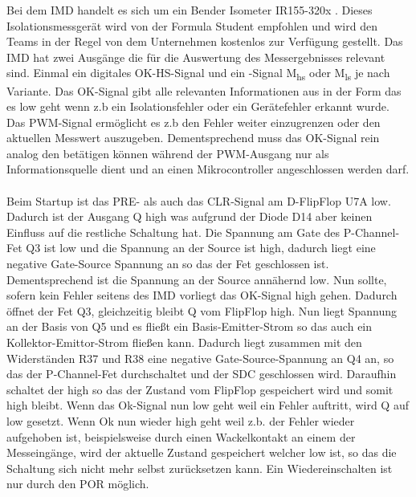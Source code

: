 Bei dem \ac{IMD} handelt es sich um ein Bender Isometer IR155-320x \cite{ISOMETERIR155-3203/IR155-3204}. Dieses Isolationsmessgerät wird von der Formula Student empfohlen und wird den Teams in der Regel von dem Unternehmen kostenlos zur Verfügung gestellt.
Das \ac{IMD} hat zwei Ausgänge die für die Auswertung des Messergebnisses relevant sind. Einmal ein digitales OK-HS-Signal und ein -Signal M\textsubscript{hs} oder M\textsubscript{ls} je nach Variante. Das OK-Signal gibt alle relevanten Informationen aus in der Form das es low geht wenn z.b ein Isolationsfehler oder ein Gerätefehler erkannt wurde. Das \ac{PWM}-Signal ermöglicht es z.b den Fehler weiter einzugrenzen oder den aktuellen Messwert auszugeben. Dementsprechend muss das OK-Signal rein analog den  betätigen können während der \ac{PWM}-Ausgang nur als Informationsquelle  dient und an einen Mikrocontroller angeschlossen werden darf. 
\\
\\
Beim Startup ist das PRE- als auch das CLR-Signal am D-FlipFlop U7A low. Dadurch ist der Ausgang Q high was aufgrund der Diode D14 aber keinen Einfluss auf die restliche Schaltung hat. Die Spannung am Gate des P-Channel-Fet Q3 ist low und die Spannung an der Source ist high, dadurch liegt eine negative Gate-Source Spannung an so das der Fet geschlossen ist. Dementsprechend ist die Spannung an der Source annähernd low. Nun sollte, sofern kein Fehler seitens des \ac{IMD} vorliegt das OK-Signal high gehen. Dadurch öffnet der Fet Q3, gleichzeitig bleibt Q vom FlipFlop high. Nun liegt Spannung an der Basis von Q5 und es fließt ein Basis-Emitter-Strom so das auch ein Kollektor-Emittor-Strom fließen kann. Dadurch liegt zusammen mit den Widerständen R37 und R38 eine negative Gate-Source-Spannung an Q4 an, so das der P-Channel-Fet durchschaltet und der \ac{SDC} geschlossen wird. Daraufhin schaltet der  high so das der Zustand vom FlipFlop gespeichert wird und somit high bleibt. Wenn das Ok-Signal nun low geht weil ein Fehler auftritt, wird Q auf low gesetzt. Wenn Ok nun wieder high geht weil z.b. der Fehler wieder aufgehoben ist, beispielsweise durch einen Wackelkontakt an einem der Messeingänge, wird der aktuelle Zustand gespeichert welcher low ist, so das die Schaltung sich nicht mehr selbst zurücksetzen kann. Ein Wiedereinschalten ist nur durch den \ac{POR} möglich.

